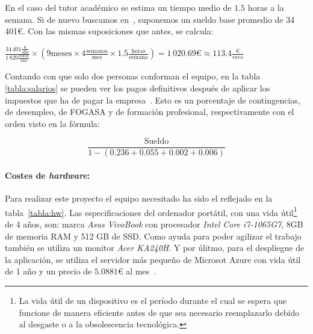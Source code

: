 En el caso del tutor académico se estima un tiempo medio de $1.5$ horas a la semana. Si de nuevo buscamos en~\cite{salarioProfe}, suponemos un sueldo base promedio de 34\,401€. Con las mismas suposiciones que antes, se calcula:
\begin{center}
	$ \frac{34\,401\frac{\text{€}}{\text{año}}}{1\,820\frac{\text{horas}}{\text{año}}} \times (9\text{meses} \times 4\frac{\text{semanas}}{\text{mes}} \times 1.5\frac{\text{horas}}{\text{semana}}) = 1\,020.69\text{€} \approx 113.4\frac{\text{€}}{mes}$
\end{center}

Contando con que solo dos personas conforman el equipo, en la tabla \ref{tabla:salarios} se pueden ver los pagos definitivos después de aplicar los impuestos que ha de pagar la empresa~\cite{impuestos}. Esto es un porcentaje de contingencias, de desempleo, de FOGASA y de formación profesional, respectivamente con el orden visto en la fórmula:

\[
\frac{\text{Sueldo}}{1-(0.236+0.055+0.002+0.006)}
\]

\begin{table}[H]
	\caption{Salarios brutos y costes después de impuestos}
	\label{tabla:salarios}
\end{table}

\paragraph{Costes de \textit{hardware}:} Para realizar este proyecto el equipo necesitado ha sido el reflejado en la tabla~\ref{tabla:hw}. Las especificaciones del ordenador portátil, con una vida útil\footnote{La vida útil de un dispositivo es el período durante el cual se espera que funcione de manera eficiente antes de que sea necesario reemplazarlo debido al desgaste o a la obsolescencia tecnológica.} de 4 años, son: marca \textit{Asus VivoBook} con procesador \textit{Intel Core i7-1065G7}, 8GB de memoria RAM y 512 GB de SSD. Como ayuda para poder agilizar el trabajo también se utiliza un monitor \textit{Acer KA240H}. Y por úlitmo, para el despliegue de la aplicación, se utiliza el servidor más pequeño de Microsot Azure con vida útil de 1 año y un precio de $5.0881€$ al mes~\cite{azure:plans}.

